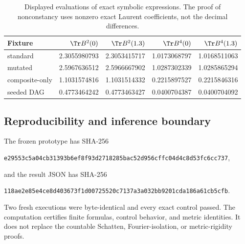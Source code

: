 \begin{table}[H]
\centering
\small
\begin{tabular}{lrrrr}
\toprule
Fixture & $\Tr B^2(0)$ & $\Tr B^2(1.3)$
& $\Tr B^4(0)$ & $\Tr B^4(1.3)$\\
\midrule
standard & 2.3055980793 & 2.3053415717 & 1.0173068797 & 1.0168511063\\
mutated & 2.5967636512 & 2.5966667902 & 1.0287302339 & 1.0285865294\\
composite-only & 1.1031574816 & 1.1031514332 & 0.2215897527 & 0.2215846316\\
seeded DAG & 0.4773464242 & 0.4773463427 & 0.0400704387 & 0.0400704092\\
\bottomrule
\end{tabular}
\caption{Displayed evaluations of exact symbolic expressions.  The
proof of nonconstancy uses nonzero exact Laurent coefficients, not the
decimal differences.}
\label{tab:samples}
\end{table}

\subsection{Reproducibility and inference boundary}

The frozen prototype has SHA-256
\begin{center}\small
\texttt{e29553c5a04cb31393b6ef8f93d2718285bac52d956cffc04d4c8d53fc6cc737},
\end{center}
and the result JSON has SHA-256
\begin{center}\small
\texttt{118ae2e85e4ce8d403673f1d00725520c7137a3a032bb9201cda186a61cb5cfb}.
\end{center}
Two fresh executions were byte-identical and every exact control
passed.  The computation certifies finite formulas, control behavior,
and metric identities.  It does not replace the countable Schatten,
Fourier-isolation, or metric-rigidity proofs.

